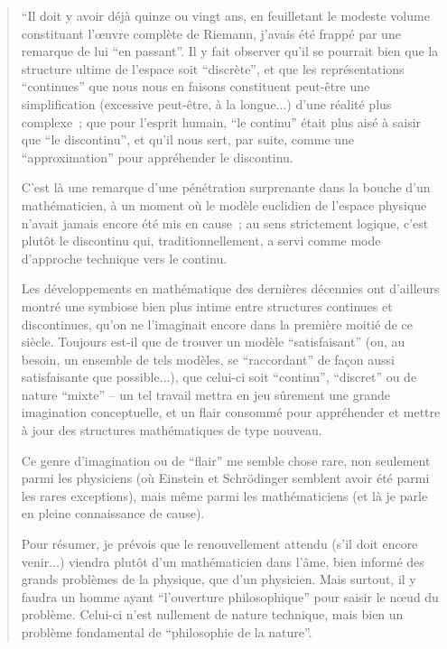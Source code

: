 \documentclass[12pt]{article}
\begin{document}
{\em

\begin{quote}``Il doit y avoir d\'ej\`a quinze ou vingt ans, en feuilletant le modeste volume constituant l'\oe uvre compl\`ete
de Riemann, j'avais \'et\'e frapp\'e par une remarque de lui ``en passant''. Il y fait observer qu'il se pourrait
bien que la structure ultime de l'espace soit ``discr\`ete'', et que les repr\'esentations ``continues'' que nous
nous en faisons constituent peut-\^etre une simplification (excessive peut-\^etre, \`a la longue$\ldots$) d'une r\'ealit\'e plus complexe~; que pour l'esprit humain, ``le continu'' \'etait plus ais\'e \`a saisir que ``le discontinu'', et qu'il nous sert, par suite, comme une ``approximation'' pour appr\'ehender le discontinu. 

C'est l\`a une remarque d'une p\'en\'etration surprenante dans la bouche d'un math\'ematicien, \`a un moment o\`u le mod\`ele euclidien de l'espace physique n'avait jamais encore \'et\'e mis en cause~; au sens strictement logique, c'est plut\^ot le discontinu qui, traditionnellement, a servi comme mode d'approche technique vers le continu.

 Les d\'eveloppements en math\'ematique des derni\`eres d\'ecennies ont d'ailleurs montr\'e une symbiose bien plus intime entre structures continues et discontinues, qu'on ne l'imaginait encore dans la premi\`ere moiti\'e de ce si\`ecle. Toujours est-il que de trouver un mod\`ele ``satisfaisant'' (ou, au besoin, un ensemble de tels mod\`eles, se ``raccordant'' de fa\c con aussi satisfaisante que possible$\ldots$), que celui-ci soit ``continu'', ``discret'' ou de nature ``mixte'' -- un tel travail mettra en jeu s\^urement une grande imagination conceptuelle, et un flair consomm\'e pour appr\'ehender et mettre \`a jour des structures math\'ematiques de type nouveau. 

Ce genre d'imagination ou de ``flair'' me semble chose rare, non seulement parmi les physiciens (o\`u Einstein et Schr\"odinger semblent avoir \'et\'e parmi les rares exceptions), mais m\^eme parmi les math\'ematiciens (et l\`a je parle en pleine connaissance de cause).

Pour r\'esumer, je pr\'evois que le renouvellement attendu (s'il doit encore venir$\ldots$) viendra plut\^ot d'un math\'ematicien dans l'\^ame, bien inform\'e des grands probl\`emes de la physique, que d'un physicien. Mais surtout, il y faudra un homme ayant ``l'ouverture philosophique'' pour saisir le n\oe ud du probl\`eme. Celui-ci n'est nullement de nature technique, mais bien un probl\`eme fondamental de ``philosophie de la nature''.\end{quote}}
\end{document}
